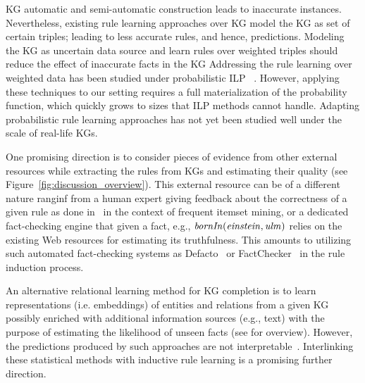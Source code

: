  KG automatic and semi-automatic construction leads to inaccurate instances. Nevertheless, existing rule learning approaches over KG model the KG as set of certain triples; leading to less accurate rules, and hence, predictions. Modeling the KG as uncertain data source and learn rules over weighted triples should reduce the effect of inaccurate facts in the KG Addressing the rule learning over weighted data has been studied under probabilistic ILP%
~\cite{probfoil,DBLP:conf/ijcai/RaedtDTBV15,DBLP:conf/clima/CorapiSIR11}.  
However, applying these techniques to our setting requires a full materialization of the probability function,
which quickly grows to sizes that ILP methods cannot handle. Adapting probabilistic rule learning approaches has not yet been studied well under the scale of real-life KGs.


One promising direction is to consider pieces of evidence from other external resources while extracting the rules from KGs and estimating their quality 
(see Figure~\ref{fig:discussion_overview}). This external resource can be of a different nature ranginf from %
a human expert giving feedback about the correctness of a given rule as done in~\cite{Dzyuba2017} in the context of frequent itemset mining, or a dedicated fact-checking engine that given a fact, e.g., $\mathit{bornIn(einstein,ulm)}$ relies on the existing Web resources for estimating its truthfulness. This amounts to utilizing such automated fact-checking systems as Defacto~\cite{defacto} or FactChecker~\cite{factchecker} in the rule induction process. 

An alternative relational learning method for KG completion is to learn representations (i.e. embeddings) of entities and relations from a given KG possibly enriched with additional information sources (e.g., text) with the %
purpose of estimating the likelihood of unseen facts (see \cite{Wang2017} for overview). However, the
predictions produced by such approaches are not interpretable~\cite{Shakerin2018}. Interlinking these statistical methods with inductive rule learning is a promising further direction.

